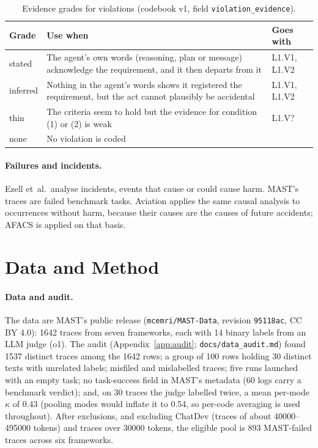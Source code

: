 \documentclass[10pt]{article}
\newcommand{\code}[1]{\texttt{#1}}
\begin{document}
\begin{table}[tbp]
\centering
\caption{Evidence grades for violations (codebook v1, field \code{violation\_evidence}).}
\label{tab:evidence}
\small
\begin{tabular}{@{}lL{9.8cm}l@{}}
\toprule
Grade & Use when & Goes with\\
\midrule
stated & The agent's own words (reasoning, plan or message) acknowledge the requirement, and it then departs from it & L1.V1, L1.V2\\
inferred & Nothing in the agent's words shows it registered the requirement, but the act cannot plausibly be accidental & L1.V1, L1.V2\\
thin & The criteria seem to hold but the evidence for condition (1) or (2) is weak & L1.V?\\
none & No violation is coded & \\
\bottomrule
\end{tabular}
\end{table}

\paragraph{Failures and incidents.} Ezell et~al.\ analyse incidents, events that
cause or could cause harm. MAST's traces are failed benchmark tasks. Aviation
applies the same causal analysis to occurrences without harm, because their
causes are the causes of future accidents; AFACS is applied on that basis.

\section{Data and Method}
\label{sec:method}

\paragraph{Data and audit.}
\label{sec:audit}
The data are MAST's public release (\code{mcemri/MAST-Data}, revision
\code{95118ac}, CC BY 4.0): \num{1642} traces from seven frameworks, each with 14
binary labels from an LLM judge (o1). The audit (Appendix~\ref{app:audit};
\code{docs/data\_audit.md}) found \num{1537} distinct traces among the \num{1642} rows;
a group of 100 rows holding 30 distinct texts with unrelated labels; misfiled and
mislabelled traces; five runs launched with an empty task; no task-success field in
MAST's metadata (60 logs carry a benchmark verdict); and, on 30 traces the judge labelled twice, a mean per-mode $\kappa$ of
0.43 (pooling modes would inflate it to 0.54, so per-code averaging is used
throughout). After exclusions, and excluding ChatDev (traces of about \num{40000}--\num{495000}
tokens) and traces over \num{30000} tokens, the eligible pool is 893 MAST-failed
traces across six frameworks.
\end{document}
